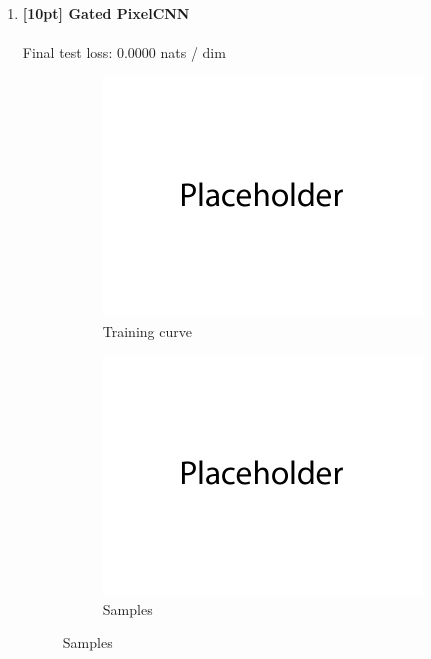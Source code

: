\documentclass{article}
\begin{document}
\newpage
{}
\begin{enumerate}

\item {\bf [10pt] Gated PixelCNN} \\\\
Final test loss: 0.0000  nats / dim
\begin{figure}[H]
    \centering
    \begin{subfigure}{0.45\textwidth}
        \centering
        \includegraphics[width=\textwidth]{figures/q4_a_train_plot.png}
        \caption{Training curve}
    \end{subfigure}
    \hspace{0.2in}
    \begin{subfigure}{0.45\textwidth}
        \centering
        \includegraphics[width=\textwidth]{figures/q4_a_samples.png}
        \caption{Samples}
    \end{subfigure}
\end{figure}


\end{enumerate}
\end{document}
